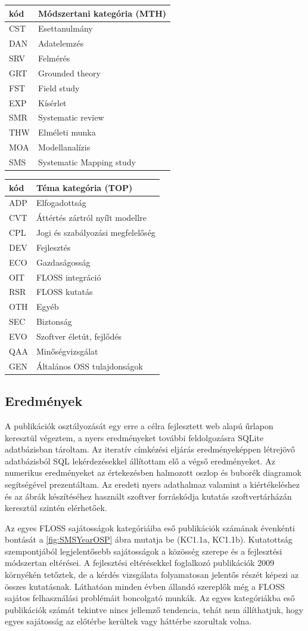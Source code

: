 \documentclass[12pt,magyar,a4paper,oneside]{scrreprt}
\begin{document}
\begin{longtable}[]{@{}ll@{}}
\toprule
kód & Módszertani kategória (MTH)\tabularnewline
\midrule
\endhead
CST & Esettanulmány\tabularnewline
DAN & Adatelemzés\tabularnewline
SRV & Felmérés\tabularnewline
GRT & Grounded theory\tabularnewline
FST & Field study\tabularnewline
EXP & Kísérlet\tabularnewline
SMR & Systematic review\tabularnewline
THW & Elméleti munka\tabularnewline
MOA & Modellanalízis\tabularnewline
SMS & Systematic Mapping study\tabularnewline
\bottomrule
\end{longtable}

\begin{longtable}[]{@{}ll@{}}
\toprule
kód & Téma kategória (TOP)\tabularnewline
\midrule
\endhead
ADP & Elfogadottság\tabularnewline
CVT & Áttértés zártról nyílt modellre\tabularnewline
CPL & Jogi és szabályozási megfelelőség\tabularnewline
DEV & Fejlesztés\tabularnewline
ECO & Gazdaságosság\tabularnewline
OIT & FLOSS integráció\tabularnewline
RSR & FLOSS kutatás\tabularnewline
OTH & Egyéb\tabularnewline
SEC & Biztonság\tabularnewline
EVO & Szoftver életút, fejlődés\tabularnewline
QAA & Minőségvizsgálat\tabularnewline
GEN & Általános OSS tulajdonságok\tabularnewline
\bottomrule
\end{longtable}

\hypertarget{eredmuxe9nyek}{%
\subsection{Eredmények}\label{eredmuxe9nyek}}

A publikációk osztályozását egy erre a célra fejlesztett web alapú
űrlapon keresztül végeztem, a nyers eredményeket további feldolgozásra
SQLite adatbázisban tároltam. Az iteratív címkézési eljárás
eredményeképpen létrejövő adatbázisból SQL lekérdezésekkel állítottam
elő a végső eredményeket. Az numerikus eredményeket az értekezésben
halmozott oszlop és buborék diagramok segítségével prezentáltam. Az
eredeti nyers adathalmaz valamint a kiértékeléshez és az ábrák
készítéséhez használt szoftver forráskódja kutatás szoftvertárházán
keresztül szintén elérhetőek.

Az egyes FLOSS sajátosságok kategóriáiba eső publikációk számának
évenkénti bontását a \ref{fig:SMSYearOSP} ábra mutatja be (KC1.1a,
KC1.1b). Kutatottság szempontjából legjelentősebb sajátosságok a
közösség szerepe és a fejlesztési módszertan eltérései. A fejlesztési
eltérésekkel foglalkozó publikációk 2009 környékén tetőztek, de a kérdés
vizsgálata folyamatosan jelentős részét képezi az összes kutatásnak.
Láthatóan minden évben állandó szereplők még a FLOSS sajátos
felhasználási problémáit boncolgató munkák. Az egyes kategóriákba eső
publikációk számát tekintve nincs jellemző tendencia, tehát nem
állíthatjuk, hogy egyes sajátosság az előtérbe kerültek vagy háttérbe
szorultak volna.
\end{document}
